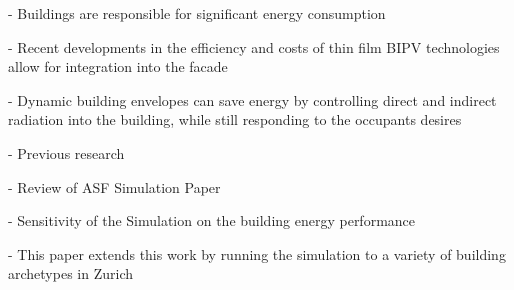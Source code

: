 
- Buildings are responsible for significant energy consumption

- Recent developments in the efficiency and costs of thin film BIPV technologies allow for integration into the facade

- Dynamic building envelopes can save energy by controlling direct and indirect radiation into the building, while still responding to the occupants desires

- Previous research

- Review of ASF Simulation Paper

- Sensitivity of the Simulation on the building energy performance

- This paper extends this work by running the simulation to a variety of building archetypes in Zurich






